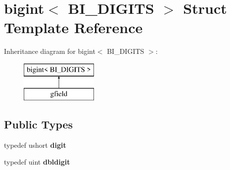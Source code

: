 \hypertarget{structbigint}{}\section{bigint$<$ B\+I\+\_\+\+D\+I\+G\+I\+TS $>$ Struct Template Reference}
\label{structbigint}
Inheritance diagram for bigint$<$ B\+I\+\_\+\+D\+I\+G\+I\+TS $>$\+:\begin{figure}[H]
\begin{center}
\leavevmode
\includegraphics[height=2.000000cm]{structbigint}
\end{center}
\end{figure}
\subsection*{Public Types}
\begin{DoxyCompactItemize}
\item 
\mbox{\label{structbigint_a4c2a0c25f7ff43453c16d96efa3d2726}} 
typedef ushort {\bfseries digit}
\item 
\mbox{\label{structbigint_a5731355b36cfe9d5292607ff58ba269b}} 
typedef uint {\bfseries dbldigit}
\end{DoxyCompactItemize}
